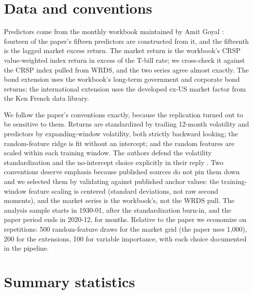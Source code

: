 \documentclass[12pt]{article}
\begin{document}
\section{Data and conventions}\label{sec:data}

Predictors come from the monthly workbook maintained by Amit Goyal
\citep{welch2008comprehensive, goyal2024comprehensive}: fourteen of the
paper's fifteen predictors are constructed from it, and the fifteenth is the
lagged market excess return. The market return is the workbook's CRSP
value-weighted index return in excess of the T-bill rate; we cross-check it
against the CRSP index pulled from WRDS, and the two series agree almost
exactly. The bond extension uses the workbook's long-term government and
corporate bond returns; the international extension uses the developed
ex-US market factor from the Ken French data library.

We follow the paper's conventions exactly, because the replication turned
out to be sensitive to them. Returns are standardized by trailing 12-month
volatility and predictors by expanding-window volatility, both strictly
backward looking; the random-feature ridge is fit without an intercept; and
the random features are scaled within each training window. The authors
defend the volatility standardization and the no-intercept choice
explicitly in their reply \citep{kelly2025reply}. Two conventions deserve
emphasis because published sources do not pin them down and we selected
them by validating against published anchor values: the training-window
feature scaling is centered (standard deviations, not raw second moments),
and the market series is the workbook's, not the WRDS pull. The analysis
sample starts in 1930-01, after the standardization burn-in, and the paper
period ends in 2020-12, for \PaperMonths{} months. Relative to the paper we
economize on repetitions: 500 random-feature draws for the market grid
(the paper uses 1{,}000), 200 for the extensions, 100 for variable
importance, with each choice documented in the pipeline.

\section{Summary statistics}\label{sec:summary}

\begin{table}[htbp]\centering\footnotesize

\caption{The information set splits into slow and fast predictors. Panel~A
summarizes the raw market excess return and the fifteen predictors; Panel~B
the volatility-standardized versions the model consumes. The first-order
autocorrelations show the split that drives everything downstream: the
valuation ratios and yields are extremely persistent, while the return-type
predictors (the lagged market return, bond returns, and the default and
inflation series) move month to month. Standardization equalizes scales
without destroying that split.}
\label{tab:summary}
\end{table}
\end{document}
